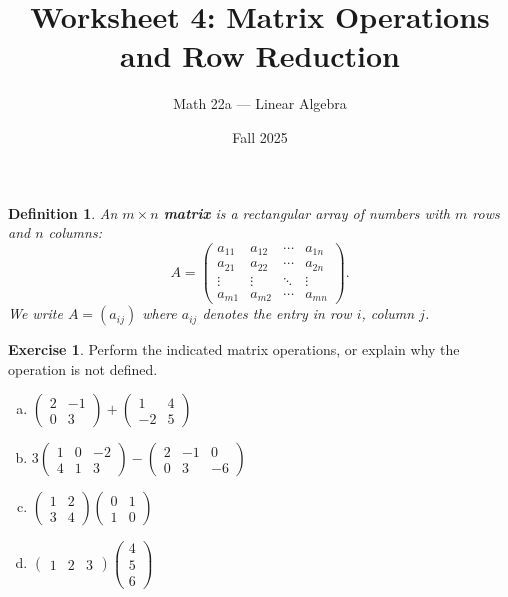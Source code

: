 \documentclass[11pt]{article}
\title{Worksheet 4: Matrix Operations and Row Reduction}
\author{Math 22a --- Linear Algebra}
\date{Fall 2025}
\newtheorem{definition}[theorem]{Definition}
\theoremstyle{definition}
\newtheorem{exercise}{Exercise}
\begin{document}
\maketitle

\begin{definition}
An $m \times n$ \textbf{matrix} is a rectangular array of numbers with $m$ rows and $n$ columns:
\[
  A = \begin{pmatrix}
    a_{11} & a_{12} & \cdots & a_{1n} \\
    a_{21} & a_{22} & \cdots & a_{2n} \\
    \vdots & \vdots & \ddots & \vdots \\
    a_{m1} & a_{m2} & \cdots & a_{mn}
  \end{pmatrix}.
\]
We write $A = (a_{ij})$ where $a_{ij}$ denotes the entry in row $i$, column $j$.
\end{definition}

\begin{exercise}
Perform the indicated matrix operations, or explain why the operation is not defined.
\begin{enumerate}[(a)]
  \item $\begin{pmatrix} 2 & -1 \\ 0 & 3 \end{pmatrix}
         + \begin{pmatrix} 1 & 4 \\ -2 & 5 \end{pmatrix}$

  \item $3 \begin{pmatrix} 1 & 0 & -2 \\ 4 & 1 & 3 \end{pmatrix}
         - \begin{pmatrix} 2 & -1 & 0 \\ 0 & 3 & -6 \end{pmatrix}$

  \item $\begin{pmatrix} 1 & 2 \\ 3 & 4 \end{pmatrix}
         \begin{pmatrix} 0 & 1 \\ 1 & 0 \end{pmatrix}$

  \item $\begin{pmatrix} 1 & 2 & 3 \end{pmatrix}
         \begin{pmatrix} 4 \\ 5 \\ 6 \end{pmatrix}$
\end{enumerate}
\end{exercise}
\end{document}
